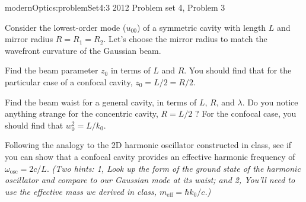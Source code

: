 {modernOptics:problemSet4:3}
{2012 Problem set 4, Problem 3}
{
Consider the lowest-order mode ($u_{00}$) of a symmetric cavity with length $L$ and mirror radius $R=R_1=R_2$. Let's choose the mirror radius to match the wavefront curvature of the Gaussian beam.

Find the beam parameter $z_0$ in terms of $L$ and $R$. You should find that for the particular case of a confocal cavity, $z_0 = L/2 = R/2$.

Find the beam waist for a general cavity, in terms of $L$, $R$, and $\lambda$. Do you notice anything strange for the concentric cavity, $R=L/2$ ? For the confocal case, you should find that $w_0^2 = L/k_0$.

Following the analogy to the 2D harmonic oscillator constructed in class, see if you can show that a confocal cavity provides an effective harmonic frequency of $\omega_{\mathrm{osc}} = 2 c/L$. {\em (Two hints: 1, Look up the form of the ground state of the harmonic oscillator and compare to our Gaussian mode at its waist; and 2, You'll need to use the effective mass we derived in class, $m_{\mathrm{eff}} = \hbar k_0/c$.)}
} %

